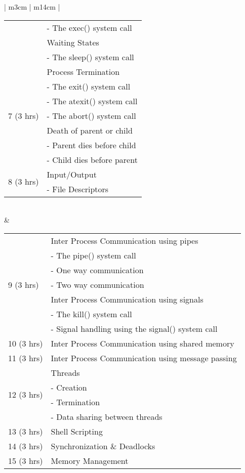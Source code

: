 \documentclass{article}
\begin{document}
\begin{longtable}{| m{3cm} | m{14cm} |}
\begin{tabular}{| m{3cm} | m{10cm} |}
						& - The exec() system call \\
						& Waiting States \\
						& - The sleep() system call \\
						\hline
						\multirow{7}{4em}{7 (3 hrs)} & Process Termination \\
						& - The exit() system call \\
						& - The atexit() system call \\
						& - The abort() system call \\
						& Death of parent or child \\
						& - Parent dies before child \\
						& - Child dies before parent \\
						\hline
						\multirow{2}{4em}{8 (3 hrs)} & Input/Output \\
						& - File Descriptors \\
						\hline
					\end{tabular}
	\\
	\hline
	 & \begin{tabular}{| m{3cm} | m{10cm} |}
		\hline
		\multirow{7}{4em}{9 (3 hrs)} & Inter Process Communication using pipes \\
		& - The pipe() system call \\
		& - One way communication \\
		& - Two way communication \\
		& Inter Process Communication using signals \\
		& - The kill() system call \\
		& - Signal handling using the signal() system call \\
		\hline
		10 (3 hrs) & Inter Process Communication using shared memory \\
		\hline
		11 (3 hrs) & Inter Process Communication using message passing \\
		\hline
		\multirow{4}{6em}{12 (3 hrs)} & Threads \\
		& - Creation \\
		& - Termination \\
		& - Data sharing between threads \\
		\hline
		13 (3 hrs) & Shell Scripting \\
		\hline
		14 (3 hrs) & Synchronization \& Deadlocks \\
		\hline
		15 (3 hrs) & Memory Management \\
		\hline 
	\end{tabular}
	\\
	\hline
\end{longtable}
\end{document}
